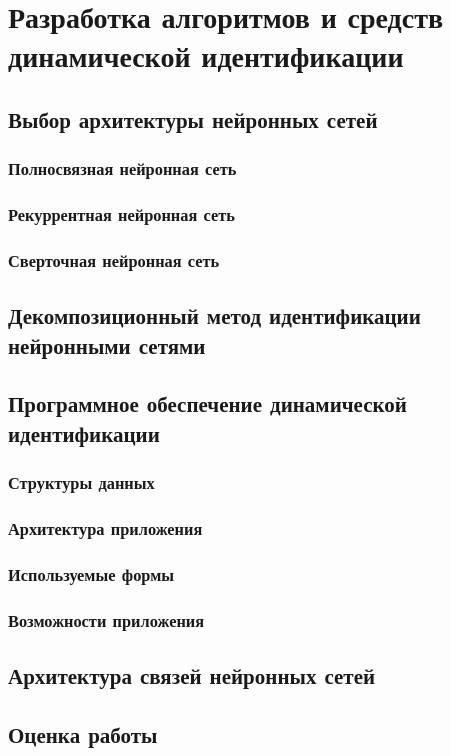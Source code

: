 \chapter{Разработка алгоритмов и средств динамической идентификации}

\section{Выбор архитектуры нейронных сетей}

\subsection{Полносвязная нейронная сеть}

\subsection{Рекуррентная нейронная сеть}

\subsection{Сверточная нейронная сеть}

\section{Декомпозиционный метод идентификации нейронными сетями}

\section{Программное обеспечение динамической идентификации}

\subsection{Структуры данных}

\subsection{Архитектура приложения}

\subsection{Используемые формы}

\subsection{Возможности приложения}

\section{Архитектура связей нейронных сетей}

\section{Оценка работы}

